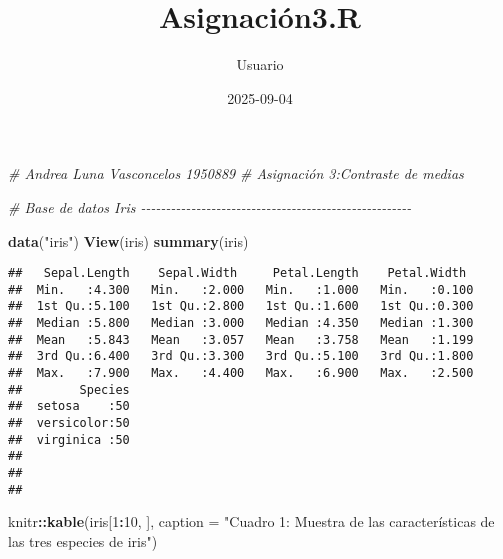 \documentclass[
]{article}
\title{Asignación3.R}
\author{Usuario}
\date{2025-09-04}
\newenvironment{Shaded}{\begin{snugshade}}{\end{snugshade}}
\newcommand{\AttributeTok}[1]{\textcolor[rgb]{0.13,0.29,0.53}{#1}}
\newcommand{\CommentTok}[1]{\textcolor[rgb]{0.56,0.35,0.01}{\textit{#1}}}
\newcommand{\DecValTok}[1]{\textcolor[rgb]{0.00,0.00,0.81}{#1}}
\newcommand{\FunctionTok}[1]{\textcolor[rgb]{0.13,0.29,0.53}{\textbf{#1}}}
\newcommand{\NormalTok}[1]{#1}
\newcommand{\SpecialCharTok}[1]{\textcolor[rgb]{0.81,0.36,0.00}{\textbf{#1}}}
\newcommand{\StringTok}[1]{\textcolor[rgb]{0.31,0.60,0.02}{#1}}
\begin{document}
\maketitle

\begin{Shaded}
\begin{Highlighting}[]
\CommentTok{\# Andrea Luna Vasconcelos 1950889}
\CommentTok{\# Asignación 3:Contraste de medias}


\CommentTok{\# Base de datos Iris {-}{-}{-}{-}{-}{-}{-}{-}{-}{-}{-}{-}{-}{-}{-}{-}{-}{-}{-}{-}{-}{-}{-}{-}{-}{-}{-}{-}{-}{-}{-}{-}{-}{-}{-}{-}{-}{-}{-}{-}{-}{-}{-}{-}{-}{-}{-}{-}{-}{-}{-}{-}{-}{-}}


\FunctionTok{data}\NormalTok{(}\StringTok{"iris"}\NormalTok{)}
\FunctionTok{View}\NormalTok{(iris)}
\FunctionTok{summary}\NormalTok{(iris)}
\end{Highlighting}
\end{Shaded}

\begin{verbatim}
##   Sepal.Length    Sepal.Width     Petal.Length    Petal.Width   
##  Min.   :4.300   Min.   :2.000   Min.   :1.000   Min.   :0.100  
##  1st Qu.:5.100   1st Qu.:2.800   1st Qu.:1.600   1st Qu.:0.300  
##  Median :5.800   Median :3.000   Median :4.350   Median :1.300  
##  Mean   :5.843   Mean   :3.057   Mean   :3.758   Mean   :1.199  
##  3rd Qu.:6.400   3rd Qu.:3.300   3rd Qu.:5.100   3rd Qu.:1.800  
##  Max.   :7.900   Max.   :4.400   Max.   :6.900   Max.   :2.500  
##        Species  
##  setosa    :50  
##  versicolor:50  
##  virginica :50  
##                 
##                 
## 
\end{verbatim}

\begin{Shaded}
\begin{Highlighting}[]
\NormalTok{knitr}\SpecialCharTok{::}\FunctionTok{kable}\NormalTok{(iris[}\DecValTok{1}\SpecialCharTok{:}\DecValTok{10}\NormalTok{, ], }\AttributeTok{caption =} \StringTok{"Cuadro 1: Muestra de las características}
\StringTok{de las tres especies de iris"}\NormalTok{)}
\end{Highlighting}
\end{Shaded}
\end{document}
